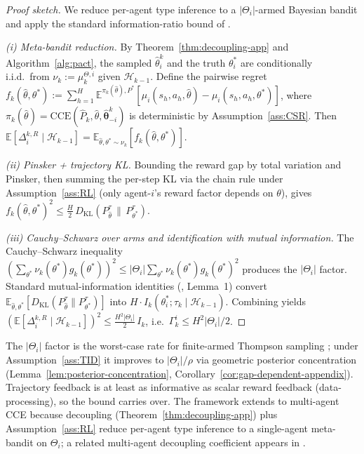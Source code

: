 \begin{proof}[Proof sketch]
We reduce per-agent type inference to a $|\Theta_i|$-armed Bayesian bandit and apply the standard information-ratio bound of \citet{russo2016information}.

\emph{(i) Meta-bandit reduction.} By Theorem~\ref{thm:decoupling-app} and Algorithm~\ref{alg:pact}, the sampled $\hat\theta_i^k$ and the truth $\theta_i^*$ are conditionally i.i.d.\ from $\nu_k := \mu_k^{\Theta,i}$ given $\mathcal{H}_{k-1}$. Define the pairwise regret $f_k(\hat\theta, \theta^*) := \sum_{h=1}^H \mathbb{E}^{\pi_k(\hat\theta), P^*}[\mu_i(s_h,a_h,\hat\theta) - \mu_i(s_h,a_h,\theta^*)]$, where $\pi_k(\hat\theta) = \mathrm{CCE}(\hat P_k, \hat\theta, \hat{\boldsymbol\theta}_{-i}^k)$ is deterministic by Assumption~\ref{ass:CSR}. Then $\mathbb{E}[\Delta_i^{k,R}\mid\mathcal{H}_{k-1}] = \mathbb{E}_{\hat\theta,\theta^*\sim\nu_k}[f_k(\hat\theta,\theta^*)]$.

\emph{(ii) Pinsker + trajectory KL.} Bounding the reward gap by total variation and Pinsker, then summing the per-step KL via the chain rule under Assumption~\ref{ass:RL} (only agent-$i$'s reward factor depends on $\theta$), gives $f_k(\hat\theta,\theta^*)^2 \le \tfrac{H}{2}\,D_{\mathrm{KL}}(P_{\hat\theta}^\tau\,\|\,P_{\theta^*}^\tau)$.

\emph{(iii) Cauchy--Schwarz over arms and identification with mutual information.} The Cauchy--Schwarz inequality $(\sum_{\theta^*}\nu_k(\theta^*) g_k(\theta^*))^2 \le |\Theta_i|\sum_{\theta^*}\nu_k(\theta^*) g_k(\theta^*)^2$ produces the $|\Theta_i|$ factor. Standard mutual-information identities (\citealp{russo2016information}, Lemma~1) convert $\mathbb{E}_{\hat\theta,\theta^*}[D_{\mathrm{KL}}(P_{\hat\theta}^\tau\|P_{\theta^*}^\tau)]$ into $H\cdot I_k(\theta_i^*;\tau_k\mid\mathcal{H}_{k-1})$. Combining yields $(\mathbb{E}[\Delta_i^{k,R}\mid\mathcal{H}_{k-1}])^2 \le \tfrac{H^2|\Theta_i|}{2}\,I_k$, i.e.\ $\Gamma_k^i \le H^2|\Theta_i|/2$.
\end{proof}

\begin{remark}
\label{rem:info-ratio-tight}
The $|\Theta_i|$ factor is the worst-case rate for finite-armed Thompson sampling \citep{russo2016information}; under Assumption~\ref{ass:TID} it improves to $|\Theta_i|/\rho$ via geometric posterior concentration (Lemma~\ref{lem:posterior-concentration}, Corollary~\ref{cor:gap-dependent-appendix}). Trajectory feedback is at least as informative as scalar reward feedback (data-processing), so the bound carries over. The framework extends to multi-agent CCE because decoupling (Theorem~\ref{thm:decoupling-app}) plus Assumption~\ref{ass:RL} reduce per-agent type inference to a single-agent meta-bandit on $\Theta_i$; a related multi-agent decoupling coefficient appears in \citet{xiong2022self}.
\end{remark}


